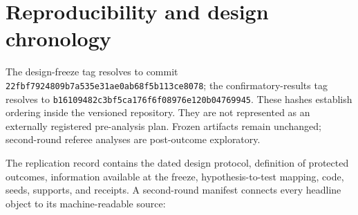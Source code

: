 \section{Reproducibility and design chronology}\label{app:reproducibility}

The design-freeze tag resolves to commit \nolinkurl{22fbf7924809b7a535e31ae0ab68f5b113ce8078}; the confirmatory-results tag resolves to \nolinkurl{b16109482c3bf5ca176f6f08976e120b04769945}. These hashes establish ordering inside the versioned repository. They are not represented as an externally registered pre-analysis plan. Frozen artifacts remain unchanged; second-round referee analyses are post-outcome exploratory.

The replication record contains the dated design protocol, definition of protected outcomes, information available at the freeze, hypothesis-to-test mapping, code, seeds, supports, and receipts. A second-round manifest connects every headline object to its machine-readable source:

